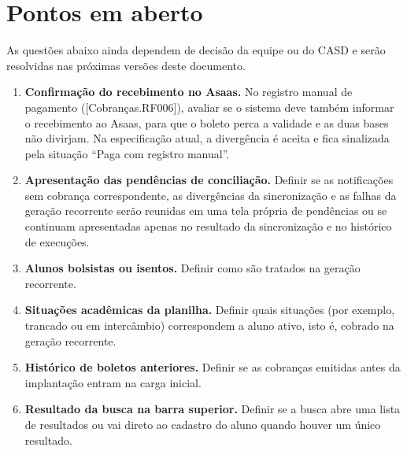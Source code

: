 \documentclass[11pt,a4paper,oneside]{report}
\begin{document}

\appendix
\chapter{Pontos em aberto}

As questões abaixo ainda dependem de decisão da equipe ou do CASD e serão resolvidas nas próximas
versões deste documento.

\begin{enumerate}
  \item \textbf{Confirmação do recebimento no Asaas.} No registro manual de pagamento
        ([Cobranças.RF006]), avaliar se o sistema deve também informar o recebimento ao Asaas, para
        que o boleto perca a validade e as duas bases não divirjam. Na especificação atual, a
        divergência é aceita e fica sinalizada pela situação ``Paga com registro manual''.
  \item \textbf{Apresentação das pendências de conciliação.} Definir se as notificações sem
        cobrança correspondente, as divergências da sincronização e as falhas da geração recorrente
        serão reunidas em uma tela própria de pendências ou se continuam apresentadas apenas no
        resultado da sincronização e no histórico de execuções.
  \item \textbf{Alunos bolsistas ou isentos.} Definir como são tratados na geração recorrente.
  \item \textbf{Situações acadêmicas da planilha.} Definir quais situações (por exemplo, trancado
        ou em intercâmbio) correspondem a aluno ativo, isto é, cobrado na geração recorrente.
  \item \textbf{Histórico de boletos anteriores.} Definir se as cobranças emitidas antes da
        implantação entram na carga inicial.
  \item \textbf{Resultado da busca na barra superior.} Definir se a busca abre uma lista de
        resultados ou vai direto ao cadastro do aluno quando houver um único resultado.
\end{enumerate}
\end{document}
